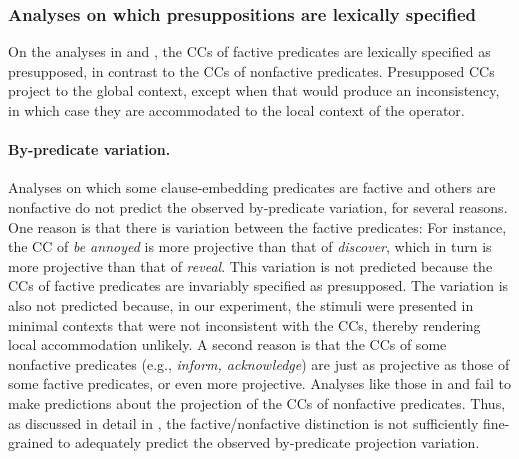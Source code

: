 \documentclass[a4paper,12pt,twoside]{article}
\begin{document}
	


\subsubsection{Analyses on which presuppositions are lexically specified}

On the analyses in \citealt{heim_projection_1983,heim_presupposition_1992} and \citealt{van_der_sandt_presupposition_1992}, the CCs of factive predicates are lexically specified as presupposed, in contrast to the CCs of nonfactive predicates. Presupposed CCs project to the global context, except when that would produce an inconsistency, in which case they are accommodated to the local context of the operator.

\paragraph{By-predicate variation.} Analyses on which some clause-embedding predicates are factive and others are nonfactive do not predict the observed by-predicate variation, for several reasons. One reason is that there is variation between the factive predicates: For instance, the CC of \emph{be annoyed} is more projective than that of \emph{discover}, which in turn is more projective than that of \emph{reveal}. This variation is not predicted because the CCs of factive predicates are invariably specified as presupposed. The variation is also not predicted because, in our experiment, the stimuli were presented in minimal contexts that were not inconsistent with the CCs, thereby rendering local accommodation unlikely. A second reason is that the CCs of some nonfactive predicates (e.g., \emph{inform, acknowledge})  are just as projective as those of some factive predicates, or even more projective. Analyses like those in \citealt{heim_projection_1983,heim_presupposition_1992} and \citealt{van_der_sandt_presupposition_1992} fail to make predictions about the projection of the CCs of nonfactive predicates. Thus, as discussed in detail in \citealt{degen_are_2022}, the factive/nonfactive distinction is not sufficiently fine-grained to adequately predict the observed by-predicate projection variation.
\end{document}
